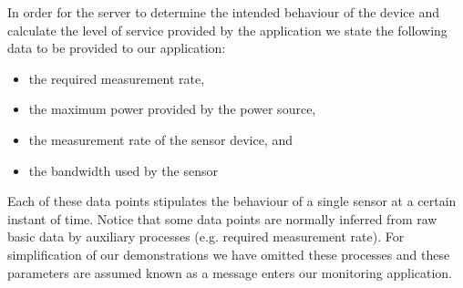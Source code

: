 In order for the server to determine the intended behaviour of the device and calculate the level of service provided by the application we state the following data to be provided to our application:
\begin{itemize}
\nospace
\item the required measurement rate,
\item the maximum power provided by the power source,
\item the measurement rate of the sensor device, and
\item the bandwidth used by the sensor 
\end{itemize}
Each of these data points stipulates the behaviour of a single sensor at a certain instant of time. Notice that some data points are normally inferred from raw basic data by auxiliary processes (e.g. required measurement rate). For simplification of our demonstrations we have omitted these processes and these parameters are assumed known as a message enters our monitoring application.



